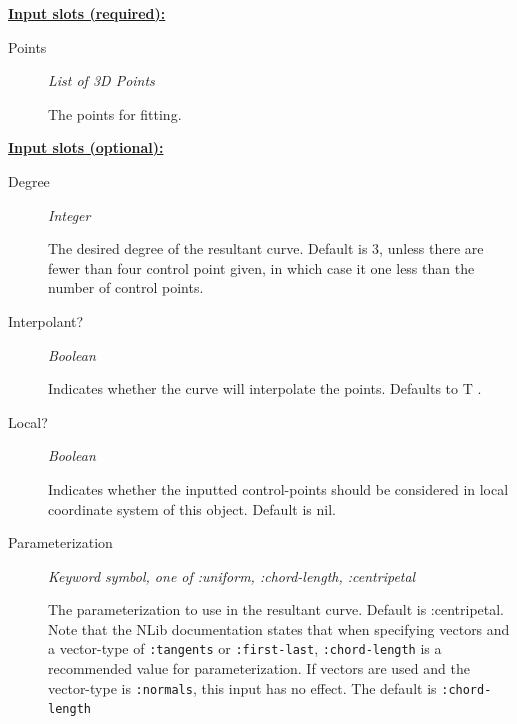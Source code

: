 \documentclass [11pt]{book}
\begin{document}
\begin{itemize}
\begin{figure}
\end{figure}





\textbf{
\underline{Input slots (required):}}

\begin{description}

\item [Points]
\emph{List of 3D Points}

 The points for fitting.




\end{description}






\textbf{
\underline{Input slots (optional):}}

\begin{description}

\item [Degree]
\emph{Integer}

 The desired degree of the resultant curve. Default is 3, unless there are fewer than four control point given,
in which case it one less than the number of control points.




\item [Interpolant?]
\emph{Boolean}

 Indicates whether the curve will interpolate the points. Defaults to T .




\item [Local?]
\emph{Boolean}

 Indicates whether the inputted control-points should be considered in local coordinate system of this object. Default is nil.




\item [Parameterization]
\emph{Keyword symbol, one of :uniform, :chord-length, :centripetal}

 The parameterization to use in the resultant curve.
Default is :centripetal. Note that the NLib documentation states that when specifying vectors and a vector-type of \texttt{:tangents}
or \texttt{:first-last}, \texttt{:chord-length} is a recommended value for parameterization. If vectors are used and the vector-type
is \texttt{:normals}, this input has no effect. The default is \texttt{:chord-length}





\end{description}
\end{itemize}
\end{document}
